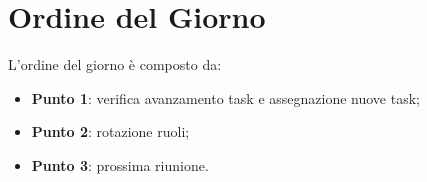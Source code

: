\section{Ordine del Giorno}
L'ordine del giorno è composto da:
\begin{itemize}
	\item \textbf{Punto 1}: verifica avanzamento task e assegnazione nuove task;
	\item \textbf{Punto 2}: rotazione ruoli;
	\item \textbf{Punto 3}: prossima riunione.
\end{itemize}

